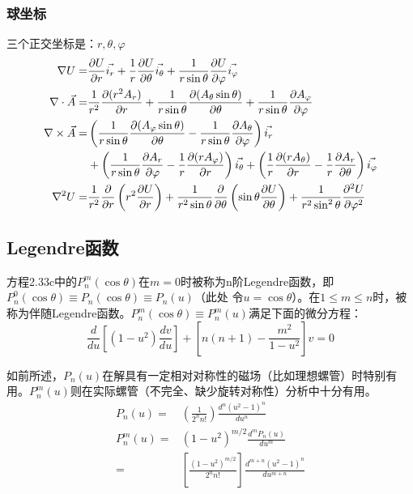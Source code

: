 \subsubsection{球坐标}
三个正交坐标是：$r, \theta, \varphi$
\begin{subequations}\label{eqn:field sphl}
	\begin{align}
\nabla U=&\frac{\partial U}{\partial r}\vec{i_r} +\frac{1}{r}\frac{\partial U}{\partial \theta}\vec{i_{\theta}}+\frac{1}{r\sin\theta}\frac{\partial U}{\partial \varphi}\vec{i_\varphi}\\
\nabla\cdot \vec{A} =& \frac{1}{r^2}\frac{\partial{(r^2 A_r)}}{\partial r} +\frac{1}{r\sin\theta}\frac{\partial{(A_\theta \sin\theta)}}{\partial\theta}+\frac{1}{r\sin\theta}\frac{\partial{A_\varphi}}{\partial \varphi} \\
\nabla\times \vec{A}=& \left(\frac{1}{r\sin\theta}\frac{\partial{(A_\varphi \sin\theta)}}{\partial \theta} -\frac{1}{r\sin\theta}\frac{\partial{A_\theta}}{\partial \varphi}\right)\vec{i_r} \notag \\
& + \left(\frac{1}{r\sin\theta}\frac{\partial{A_r}}{\partial \varphi} -\frac{1}{r}\frac{\partial{(r A_\varphi)}}{\partial r}\right) \vec{i_\theta}
+ \left(\frac{1}{r}\frac{\partial{(r A_\theta)}}{\partial r} -\frac{1}{r}\frac{\partial{A_r}}{\partial \theta}\right)\vec{i_\varphi}  \\
\nabla^2 U=&\frac{1}{r^2}\frac{\partial}{\partial r}\left(r^2\frac{\partial U}{\partial r}\right)+
\frac{1}{r^2\sin\theta}\frac{\partial}{\partial\theta}\left(\sin\theta\frac{\partial U}{\partial \theta}\right)+\frac{1}{r^2\sin^2\theta}\frac{\partial^2 U}{\partial \varphi^2}
  	\end{align}
\end{subequations}

\subsection{Legendre函数}
方程2.33c中的$P_n^m(\cos\theta)$在$m=0$时被称为n阶Legendre函数，即$P_n^0(\cos\theta)\equiv P_n(\cos\theta)\equiv P_n(u)$（此处
令$u=\cos\theta$）。在$1\le m \le n$时，被称为伴随Legendre函数。$P_n^m(\cos\theta)\equiv P_n^m(u)$满足下面的微分方程：
\begin{equation}\label{eqn:legendre diff}
  \frac{d}{du}[(1-u^2)\frac{dv}{du}]+[n(n+1)-\frac{m^2}{1-u^2}]v=0
\end{equation}

如前所述，$P_n(u)$在解具有一定相对对称性的磁场（比如理想螺管）时特别有用。$P_n^m(u)$则在实际螺管（不完全、缺少旋转对称性）分析中十分有用。
\begin{subequations}\label{eqn:legendre function1}
	\begin{align}
P_n(u)=&\left(\frac{1}{2^n n!}\right)\frac{d^n(u^2-1)^n}{du^n} \\
P_n^m(u)=&(1-u^2)^{m/2}\frac{d^mP_n(u)}{du^m}\\
=&\left[\frac{(1-u^2)^{m/2}}{2^n n!}\right]\frac{d^{m+n}(u^2-1)^n}{du^{m+n}}
  	\end{align}
\end{subequations}

